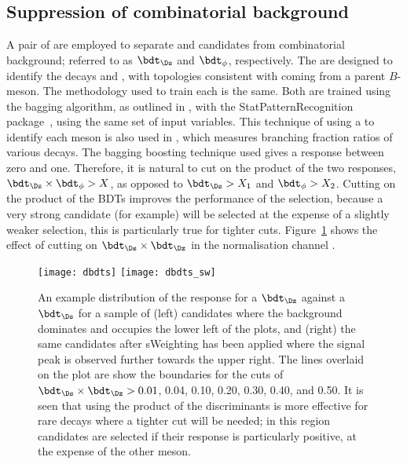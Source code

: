 \subsection{Suppression of combinatorial background}
A pair of  are employed to
separate \dstokkpi and \phitokk candidates from combinatorial background; referred to as
$\bdt_{\Ds}$ and $\bdt_{\phi}$, respectively.
The  are designed to identify the
decays \dstokkpi and \phitokk, with topologies consistent with coming from a parent $B$-meson.
The methodology used to train each \bdt is the same.
Both are trained using the bagging algorithm, as outlined in , with the
StatPatternRecognition package~\cite{Narsky:2005xpa}, using the same set of
input variables.
This technique of using a \bdt to identify each meson is also used in
, which measures branching fraction ratios of various  decays.
The bagging boosting technique used gives
a response between zero and one.
Therefore, it is natural to cut on the product of the two \BDT responses,
$\bdt_{\Ds}\times\bdt_\phi>X$, as opposed to $\bdt_{\Ds}>X_1$ and $\bdt_\phi>X_2$.
Cutting on the product of the \glspl{BDT} improves the performance of the selection, because a
very strong \Ds candidate (for example) will be selected at the expense of a slightly weaker \phii
selection, this is particularly true for tighter cuts.
Figure~\ref{fig:dsphi:bdtprod} shows the effect of cutting on $\bdt_{\Ds}\times\bdt_{\Dz}$ in the
normalisation channel \btodsd.

\begin{figure}
  \begin{center}
    \texttt{[image: dbdts]}
    \texttt{[image: dbdts\_sw]}
    \caption[Example distribution of $\mathrm{BDT}_{D_s^+}\times\mathrm{BDT}_{D^0}$ from candidates
      for the decay \btodsd]
    {
      An example distribution of the response for a $\bdt_{\Dz}$ against a $\bdt_{\Ds}$ for a
      sample of (left) \btodsd candidates where the background dominates and occupies the lower
      left of the plots, and (right) the same candidates after sWeighting has been applied where
      the signal peak is observed further towards the upper right.
      The lines overlaid on the plot are show the boundaries for the cuts of
      $\bdt_{\Ds}\times\bdt_{\Dz}>0.01$, 0.04, 0.10, 0.20, 0.30, 0.40, and 0.50.
      It is seen that using the product of the \bdt discriminants is more effective for rare decays
      where a tighter cut will be needed; in this region candidates are selected if their response
      is particularly positive, at the expense of the other meson.
    }
    \label{fig:dsphi:bdtprod}
  \end{center}
\end{figure}

